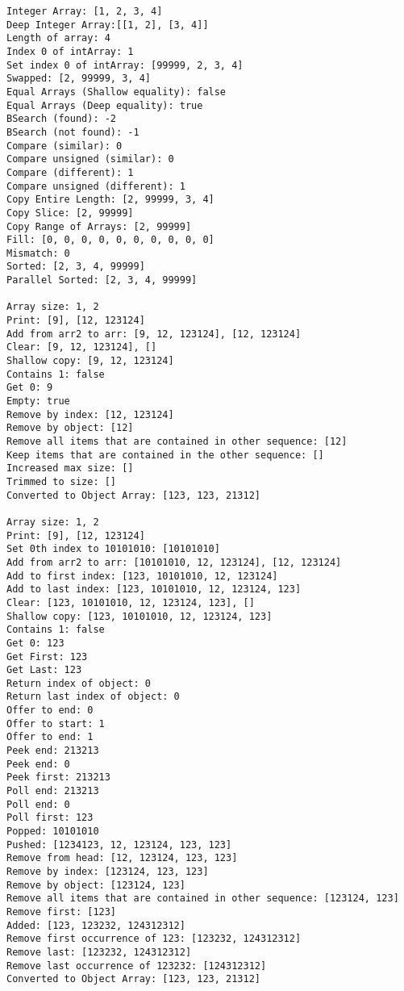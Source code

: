 \documentclass[11pt]{article}
\makeatletter
\newcommand{\boxspacing}{\kern\kvtcb@left@rule\kern\kvtcb@boxsep}
\newcommand{\prompt}[4]{
        {\ttfamily\llap{{\color{#2}[#3]:\hspace{3pt}#4}}\vspace{-\baselineskip}}
    }
\makeatother
\begin{document}
    \begin{Verbatim}[commandchars=\\\{\}]
Integer Array: [1, 2, 3, 4]
Deep Integer Array:[[1, 2], [3, 4]]
Length of array: 4
Index 0 of intArray: 1
Set index 0 of intArray: [99999, 2, 3, 4]
Swapped: [2, 99999, 3, 4]
Equal Arrays (Shallow equality): false
Equal Arrays (Deep equality): true
BSearch (found): -2
BSearch (not found): -1
Compare (similar): 0
Compare unsigned (similar): 0
Compare (different): 1
Compare unsigned (different): 1
Copy Entire Length: [2, 99999, 3, 4]
Copy Slice: [2, 99999]
Copy Range of Arrays: [2, 99999]
Fill: [0, 0, 0, 0, 0, 0, 0, 0, 0, 0]
Mismatch: 0
Sorted: [2, 3, 4, 99999]
Parallel Sorted: [2, 3, 4, 99999]

Array size: 1, 2
Print: [9], [12, 123124]
Add from arr2 to arr: [9, 12, 123124], [12, 123124]
Clear: [9, 12, 123124], []
Shallow copy: [9, 12, 123124]
Contains 1: false
Get 0: 9
Empty: true
Remove by index: [12, 123124]
Remove by object: [12]
Remove all items that are contained in other sequence: [12]
Keep items that are contained in the other sequence: []
Increased max size: []
Trimmed to size: []
Converted to Object Array: [123, 123, 21312]

Array size: 1, 2
Print: [9], [12, 123124]
Set 0th index to 10101010: [10101010]
Add from arr2 to arr: [10101010, 12, 123124], [12, 123124]
Add to first index: [123, 10101010, 12, 123124]
Add to last index: [123, 10101010, 12, 123124, 123]
Clear: [123, 10101010, 12, 123124, 123], []
Shallow copy: [123, 10101010, 12, 123124, 123]
Contains 1: false
Get 0: 123
Get First: 123
Get Last: 123
Return index of object: 0
Return last index of object: 0
Offer to end: 0
Offer to start: 1
Offer to end: 1
Peek end: 213213
Peek end: 0
Peek first: 213213
Poll end: 213213
Poll end: 0
Poll first: 123
Popped: 10101010
Pushed: [1234123, 12, 123124, 123, 123]
Remove from head: [12, 123124, 123, 123]
Remove by index: [123124, 123, 123]
Remove by object: [123124, 123]
Remove all items that are contained in other sequence: [123124, 123]
Remove first: [123]
Added: [123, 123232, 124312312]
Remove first occurrence of 123: [123232, 124312312]
Remove last: [123232, 124312312]
Remove last occurrence of 123232: [124312312]
Converted to Object Array: [123, 123, 21312]
    \end{Verbatim}

    \begin{tcolorbox}[breakable, size=fbox, boxrule=1pt, pad at break*=1mm,colback=cellbackground, colframe=cellborder]
\prompt{In}{incolor}{ }{\boxspacing}
\begin{Verbatim}[commandchars=\\\{\}]

\end{Verbatim}
\end{tcolorbox}


    
    
    
\end{document}
